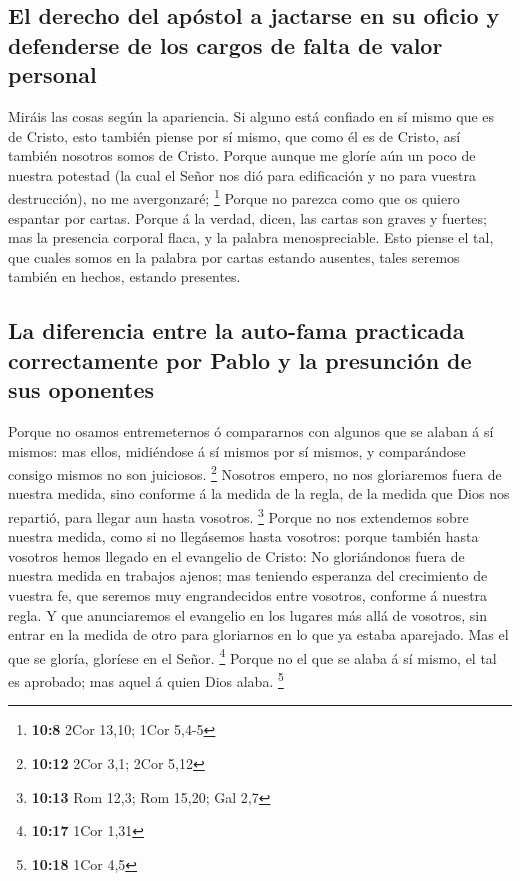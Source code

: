 \hypertarget{el-derecho-del-apuxf3stol-a-jactarse-en-su-oficio-y-defenderse-de-los-cargos-de-falta-de-valor-personal}{%
\subsection{El derecho del apóstol a jactarse en su oficio y defenderse
de los cargos de falta de valor
personal}\label{el-derecho-del-apuxf3stol-a-jactarse-en-su-oficio-y-defenderse-de-los-cargos-de-falta-de-valor-personal}}

 Miráis las cosas según la apariencia. Si alguno está
confiado en sí mismo que es de Cristo, esto también piense por sí mismo,
que como él es de Cristo, así también nosotros somos de Cristo.
 Porque aunque me gloríe aún un poco de nuestra potestad
(la cual el Señor nos dió para edificación y no para vuestra
destrucción), no me avergonzaré; \footnote{\textbf{10:8} 2Cor 13,10;
  1Cor 5,4-5}  Porque no parezca como que os quiero
espantar por cartas.  Porque á la verdad, dicen, las
cartas son graves y fuertes; mas la presencia corporal flaca, y la
palabra menospreciable.  Esto piense el tal, que cuales
somos en la palabra por cartas estando ausentes, tales seremos también
en hechos, estando presentes.

\hypertarget{la-diferencia-entre-la-auto-fama-practicada-correctamente-por-pablo-y-la-presunciuxf3n-de-sus-oponentes}{%
\subsection{La diferencia entre la auto-fama practicada correctamente
por Pablo y la presunción de sus
oponentes}\label{la-diferencia-entre-la-auto-fama-practicada-correctamente-por-pablo-y-la-presunciuxf3n-de-sus-oponentes}}

 Porque no osamos entremeternos ó compararnos con algunos
que se alaban á sí mismos: mas ellos, midiéndose á sí mismos por sí
mismos, y comparándose consigo mismos no son juiciosos. \footnote{\textbf{10:12}
  2Cor 3,1; 2Cor 5,12}  Nosotros empero, no nos
gloriaremos fuera de nuestra medida, sino conforme á la medida de la
regla, de la medida que Dios nos repartió, para llegar aun hasta
vosotros. \footnote{\textbf{10:13} Rom 12,3; Rom 15,20; Gal 2,7}
 Porque no nos extendemos sobre nuestra medida, como si
no llegásemos hasta vosotros: porque también hasta vosotros hemos
llegado en el evangelio de Cristo:  No gloriándonos fuera
de nuestra medida en trabajos ajenos; mas teniendo esperanza del
crecimiento de vuestra fe, que seremos muy engrandecidos entre vosotros,
conforme á nuestra regla.  Y que anunciaremos el
evangelio en los lugares más allá de vosotros, sin entrar en la medida
de otro para gloriarnos en lo que ya estaba aparejado. 
Mas el que se gloría, gloríese en el Señor. \footnote{\textbf{10:17}
  1Cor 1,31}  Porque no el que se alaba á sí mismo, el
tal es aprobado; mas aquel á quien Dios alaba. \footnote{\textbf{10:18}
  1Cor 4,5}

